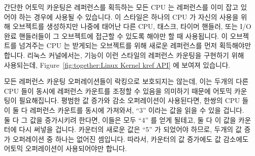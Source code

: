 간단한 어토믹 카운팅은 레퍼런스를 획득하는 모든 CPU 는 레퍼런스를 이미 잡고
있어야 하는 경우에 사용될 수 있습니다.
이 스타일은 하나의 CPU 가 자신의 사용을 위해 오브젝트를 생성하지만 나중에
태어난 다른 CPU, 태스크, 타이머 핸들러, 또는 I/O 완료 핸들러들이 그 오브젝트에
접근할 수 있도록 해야만 할 때 사용됩니다.
이 오브젝트를 넘겨주는 CPU 는 받게되는 오브젝트를 위해 새로운 레퍼런스를 먼저
획득해야만 합니다.
리눅스 커널에서는,  기능이 이런 스타일의 레퍼런스 카운팅을 구현하기
위해 사용되는데,
Figure~\ref{fig:together:Linux Kernel kref API} 에 보여져 있습니다.
\iffalse

Simple atomic counting may be used in cases where any CPU acquiring
a reference must already hold a reference.
This style is used when a single CPU creates an object for its
own private use, but must allow other CPU, tasks, timer handlers,
or I/O completion handlers that it later spawns to also access this object.
Any CPU that hands the object off must first acquire a new reference
on behalf of the recipient object.
In the Linux kernel, the \co{kref} primitives are used to implement
this style of reference counting, as shown in
Figure~\ref{fig:together:Linux Kernel kref API}.
\fi

모든 레퍼런스 카운팅 오퍼레이션들이 락킹으로 보호되지는 않는데, 이는 두개의
다른 CPU 들이 동시에 레퍼런스 카운트를 조정할 수 있음을 의미하기 때문에 어토믹
카운팅이 필요해집니다.
평범한 값 증가와 감소 오퍼레이션이 사용된다면, 한쌍의 CPU 들이 둘 다 레퍼런스
카운트를 동시에 가져와서, ``3'' 이라는 값을 읽을 수 있을 겁니다.
둘 다 그 값을 증가시키려 한다면, 이들은 모두 ``4'' 를 얻게 될테고, 둘 다 이
값을 카운터에 다시 써넣을 겁니다.
카운터의 새로운 값은 ``5'' 가 되었어야 하므로, 두개의 값 증가 오퍼레이션 중
하나는 없어진 셈입니다.
따라서, 카운터의 값 증가에도 값 감소에도 어토믹 오퍼레이션이 사용되어야만
합니다.
\iffalse

Atomic counting is required
because locking is not used to protect all reference-count operations,
which means that it is possible for two different CPUs to concurrently
manipulate the reference count.
If normal increment and decrement were used, a pair of CPUs might both
fetch the reference count concurrently, perhaps both obtaining
the value ``3''.
If both of them increment their value, they will both obtain ``4'',
and both will store this value back into the counter.
Since the new value of the counter should instead be ``5'', one
of the two increments has been lost.
Therefore, atomic operations must be used both for counter increments
and for counter decrements.
\fi

